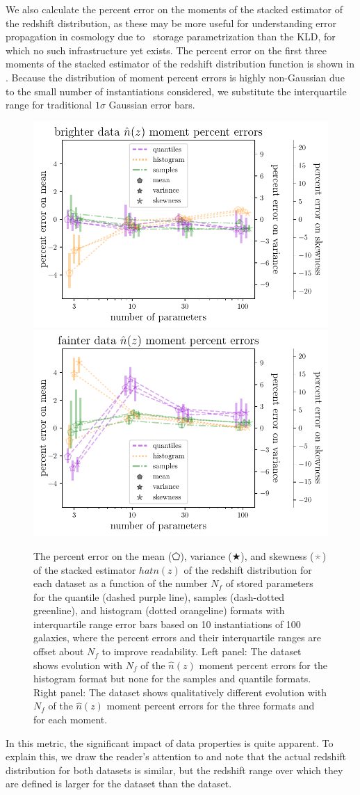 We also calculate the percent error on the moments of the stacked estimator of 
the redshift distribution, as these may be more useful for understanding error 
propagation in cosmology due to \pz\ storage parametrization than the KLD, for 
which no such infrastructure yet exists.
The percent error on the first three moments of the stacked estimator of the 
redshift distribution function is shown in .
Because the distribution of moment percent errors is highly non-Gaussian due to 
the small number of instantiations considered, we substitute the interquartile 
range for traditional $1\sigma$ Gaussian error bars.
\begin{figure}
	\begin{center}
		\includegraphics[width=0.5\columnwidth]{figures/qp/graham_nz_err.pdf}    
		\includegraphics[width=0.5\columnwidth]{figures/qp/schmidt_nz_err.pdf}
		\caption{
			The percent error on the mean ($\pentagon$), variance ($\bigstar$), and 
			skewness ($\APLstar$) of the stacked estimator $hat{n}(z)$ of the redshift 
			distribution for each dataset as a function of the number $N_{f}$ of stored 
			parameters for the quantile (dashed purple line), samples (dash-dotted 
			greenline), and histogram (dotted orangeline) formats with interquartile range 
			error bars based on 10 instantiations of 100 galaxies, where the percent errors 
			and their interquartile ranges are offset about $N_{f}$ to improve readability.
			Left panel: The \mgdata dataset shows evolution with $N_{f}$ of the 
			$\hat{n}(z)$ moment percent errors for the histogram format but none for the 
			samples and quantile formats.
			Right panel: The \ssdata dataset shows qualitatively different evolution 
			with $N_{f}$ of the $\hat{n}(z)$ moment percent errors for the three formats 
			and for each moment.
			}
	\end{center}
\end{figure}
In this metric, the significant impact of data properties is quite apparent.
To explain this, we draw the reader's attention to  and 
note that the actual redshift distribution for both datasets is similar, but 
the redshift range over which they are defined is larger for the \mgdata 
dataset than the \ssdata dataset.

